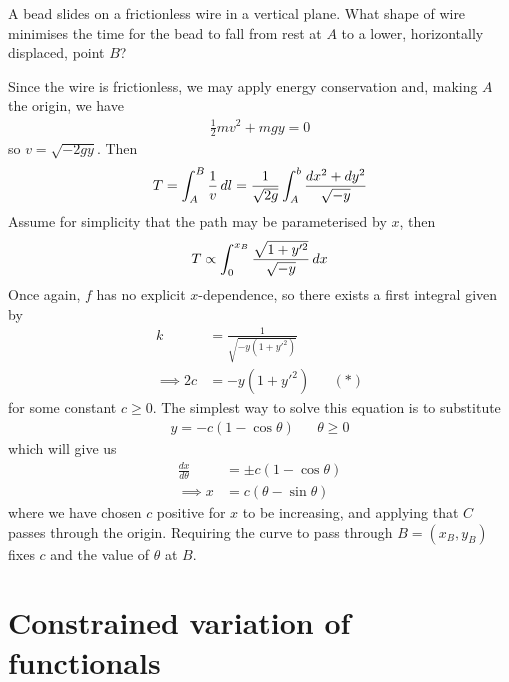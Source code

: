 \documentclass{../../template/note}
\begin{document}
    \begin{example*}
        A bead slides on a frictionless wire in a vertical plane. What shape of wire minimises the time for the bead to fall from rest at $A$ to a lower, horizontally displaced, point $B$?

        Since the wire is frictionless, we may apply energy conservation and, making $A$ the origin, we have
        \begin{align*}
            \frac 1 2 mv^2 + mgy = 0
        \end{align*}
        so $v = \sqrt{-2gy}$. Then
        \begin{align*}
            T = \int_A^B \frac 1 v \,d{l} = \frac 1 {\sqrt{2g}} \int_A^b \frac{dx^2+dy^2}{\sqrt{-y}}
        \end{align*}
        Assume for simplicity that the path may be parameterised by $x$, then
        \begin{align*}
            T \propto \int_0^{x_B} \frac{\sqrt{1+y'^2}}{\sqrt{-y}} \,d{x}
        \end{align*}
        Once again, $f$ has no explicit $x$-dependence, so there exists a first integral given by
        \begin{align*}
            k &= \frac{1}{\sqrt{-y(1+y'^2)}} \\
            \implies 2c &= -y(1+y'^2) && (*)
        \end{align*}
        for some constant $c \geq 0$. The simplest way to solve this equation is to substitute
        \begin{align*}
            y = -c(1-\cos \theta) && \theta \geq 0
        \end{align*}
        which will give us
        \begin{align*}
            \frac{dx}{d\theta} &= \pm c(1-\cos \theta) \\
            \implies x &= c(\theta - \sin \theta)
        \end{align*}
        where we have chosen $c$ positive for $x$ to be increasing, and applying that $C$ passes through the origin. Requiring the curve to pass through $B = (x_B, y_B)$ fixes $c$ and the value of $\theta$ at $B$.
    \end{example*}
    
    \section{Constrained variation of functionals}
\end{document}
